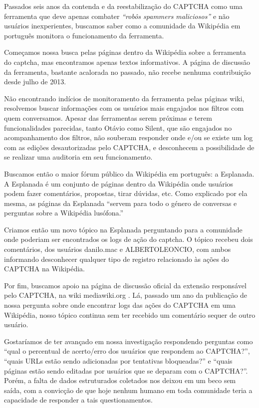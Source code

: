 
Passados seis anos da contenda e da reestabilização do CAPTCHA como uma ferramenta que deve apenas combater \textit{“robôs spammers maliciosos”} e não usuários inexperientes, buscamos saber como a comunidade da Wikipédia em português monitora o funcionamento da ferramenta.

Começamos nossa busca pelas páginas dentro da Wikipédia sobre a ferramenta do captcha, mas encontramos apenas textos informativos. A página de discussão da ferramenta, bastante acalorada no passado, não recebe nenhuma contribuição desde julho de 2013.

Não encontrando indícios de monitoramento da ferramenta pelas páginas wiki, resolvemos buscar informações com os usuários mais engajados nos filtros com quem conversamos. Apesar das ferramentas serem próximas e terem funcionalidades parecidas, tanto Otávio como Silent, que são engajados no acompanhamento dos filtros, não souberam responder onde e/ou se existe um log com as edições desautorizadas pelo CAPTCHA, e desconhecem a possibilidade de se realizar uma auditoria em seu funcionamento. 

Buscamos então o maior fórum público da Wikipédia em português: a Esplanada. A Esplanada é um conjunto de páginas dentro da Wikipédia onde usuários podem fazer comentários, propostas, tirar dúvidas, etc. Como explicado por ela mesma, as páginas da Esplanada “servem para todo o género de conversas e perguntas sobre a Wikipédia lusófona.” 

Criamos então um novo tópico na Esplanada perguntando para a comunidade onde poderiam ser encontrados os logs de ação do captcha.   O tópico recebeu dois comentários, dos usuários danilo.mac e ALBERTOLEONCIO, com ambos informando desconhecer qualquer tipo de registro relacionado às ações do CAPTCHA na Wikipédia.

Por fim, buscamos apoio na página de discussão oficial da extensão responsável pelo CAPTCHA, na wiki mediawiki.org . Lá, passado um ano da publicação de nossa pergunta sobre onde encontrar logs das ações do CAPTCHA em uma Wikipédia, nosso tópico continua sem ter recebido um comentário sequer de outro usuário. 

Gostaríamos de ter avançado em nossa investigação respondendo perguntas como ``qual o percentual de acerto/erro dos usuários que respondem ao CAPTCHA?'', “quais URLs estão sendo adicionadas por tentativas bloqueadas?” e “quais páginas estão sendo editadas por usuários que se deparam com o CAPTCHA?”. Porém, a falta de dados estruturados coletados nos deixou em um beco sem saída, com a convicção de que hoje nenhum humano em toda comunidade teria a capacidade de responder a tais questionamentos.

